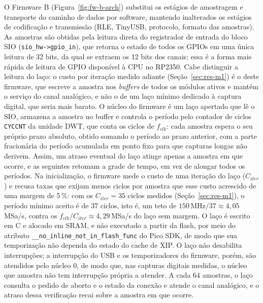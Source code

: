 O Firmware B (Figura~\ref{fig:fw-b-arch}) substitui os estágios de amostragem e transporte do caminho de
dados por software, mantendo inalterados os estágios de codificação e
transmissão (\ac{RLE}, TinyUSB, protocolo, formato das amostras). As amostras são
obtidas pela leitura direta do registrador de entrada do bloco \ac{SIO}
(\texttt{sio\_hw->gpio\_in}), que retorna o estado de todos os \acp{GPIO} em uma
única leitura de 32 bits, da qual se extraem os 12 bits dos canais; essa é a
forma mais rápida de leitura de \ac{GPIO} disponível à \ac{CPU} no RP2350. Cabe
distinguir a leitura do laço: o custo por iteração medido adiante
(Seção~\ref{sec:res-m1}) é o deste firmware, que escreve a amostra nos
\emph{buffers} de todos os módulos ativos e mantém o serviço do canal
analógico, e não o de um laço mínimo dedicado à captura digital, que seria
mais barato. O núcleo do
firmware é um laço apertado que lê o \ac{SIO}, armazena a amostra no buffer e
controla o período pelo contador de ciclos \texttt{CYCCNT} da unidade \ac{DWT}, que conta os
ciclos de $f_{clk}$: cada amostra espera o seu próprio prazo absoluto, obtido
somando o período ao prazo anterior, com a parte fracionária do período
acumulada em ponto fixo para que capturas longas não derivem. Assim, um atraso
eventual do laço atinge apenas a amostra em que ocorre, e as seguintes retomam
a grade de tempo, em vez de alongar todos os períodos. Na inicialização, o
firmware mede o custo de uma iteração do laço ($C_{iter}$) e recusa taxas que
exijam menos ciclos por amostra que esse custo acrescido de uma margem de
5\,\%: com os $C_{iter} = 35$ ciclos medidos (Seção~\ref{sec:res-m1}), o
período mínimo aceito é de 37 ciclos, isto é, um teto de
$150\,\text{MHz}/37 \approx 4{,}05$\,MSa/s, contra os
$f_{clk}/C_{iter} \approx 4{,}29$\,MSa/s do laço sem margem. O laço é escrito em C e alocado em \ac{SRAM}, e não executado a partir
da flash, por meio do atributo \texttt{\_\_no\_inline\_not\_in\_flash\_func}
do Pico \ac{SDK}, de modo que sua temporização não dependa do estado do cache
de \acs{XIP}. O laço não desabilita interrupções; a interrupção do
\ac{USB} e os temporizadores do firmware, porém, são atendidos pelo núcleo 0,
de modo que, nas capturas digitais medidas, o núcleo que amostra não tem
interrupção própria a atender. A cada 64 amostras, o laço consulta o pedido
de aborto e o estado da conexão e atende o canal analógico, e o atraso dessa
verificação recai sobre a amostra em que ocorre.

